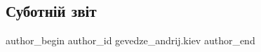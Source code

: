  
 
 
 
 
 
\subsection{Суботній звіт}
\label{sec:01_05_2022.fb.gevedze_andrij.kiev.1.subotnij_zvit}
 
\ifcmt
 author_begin
   author_id gevedze_andrij.kiev
 author_end
\fi
